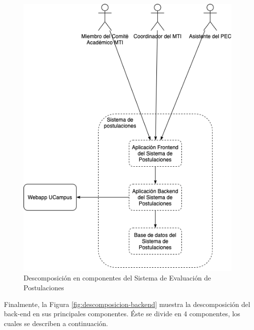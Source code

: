 \begin{figure}[!ht]
    \begin{center}
        \includegraphics[scale=0.5]{imagenes/03-descomposicion-sistema.png}
    \end{center}
    \caption{Descomposición en componentes del Sistema de Evaluación de Postulaciones}
    \label{fig:descomposicion-sistema}
\end{figure}

Finalmente, la Figura \ref{fig:descomposicion-backend} muestra la descomposición
del back-end en sus principales componentes. Éste se divide en 4 componentes,
los cuales se describen a continuación.

